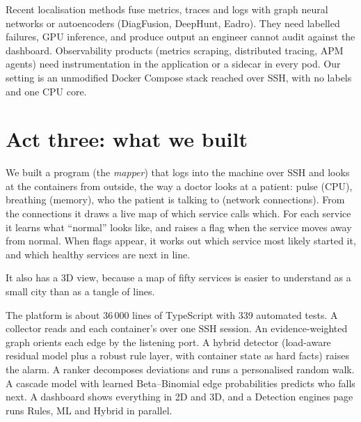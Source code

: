 \begin{techbox}
Recent localisation methods fuse metrics, traces and logs with graph neural networks or autoencoders (DiagFusion, DeepHunt, Eadro). They need labelled failures, GPU inference, and produce output an engineer cannot audit against the dashboard. Observability products (metrics scraping, distributed tracing, APM agents) need instrumentation in the application or a sidecar in every pod. Our setting is an unmodified Docker Compose stack reached over SSH, with no labels and one CPU core.
\end{techbox}

\section{Act three: what we built}
\begin{simplebox}
We built a program (the \emph{mapper}) that logs into the machine over SSH and looks at the containers from outside, the way a doctor looks at a patient: pulse (CPU), breathing (memory), who the patient is talking to (network connections). From the connections it draws a live map of which service calls which. For each service it learns what ``normal'' looks like, and raises a flag when the service moves away from normal. When flags appear, it works out which service most likely started it, and which healthy services are next in line.

It also has a 3D view, because a map of fifty services is easier to understand as a small city than as a tangle of lines.
\end{simplebox}

\begin{techbox}
The platform is about 36\,000 lines of TypeScript with 339 automated tests. A collector reads  and each container's  over one SSH session. An evidence-weighted graph orients each edge by the listening port. A hybrid detector (load-aware residual model plus a robust rule layer, with container state as hard facts) raises the alarm. A ranker decomposes deviations and runs a personalised random walk. A cascade model with learned Beta--Binomial edge probabilities predicts who falls next. A dashboard shows everything in 2D and 3D, and a Detection engines page runs Rules, ML and Hybrid in parallel.
\end{techbox}

